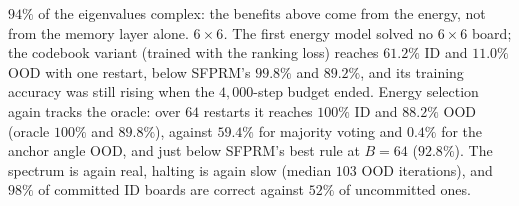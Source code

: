 $94\%$ of the eigenvalues complex: the benefits above come from the energy, not from the memory
layer alone.
\emph{$6\times6$.} The first energy model solved no $6\times6$ board; the codebook variant (trained
with the ranking loss) reaches $61.2\%$ ID and $11.0\%$ OOD with one restart, below SFPRM's
$99.8\%$ and $89.2\%$, and its training accuracy was still rising when the $4{,}000$-step budget
ended. Energy selection again tracks the oracle: over $64$ restarts it reaches $100\%$ ID and
$88.2\%$ OOD (oracle $100\%$ and $89.8\%$), against $59.4\%$ for majority voting and $0.4\%$ for
the anchor angle OOD, and just below SFPRM's best rule at $B{=}64$ ($92.8\%$). The spectrum is again
real, halting is again slow (median $103$ OOD iterations), and $98\%$ of committed ID boards are
correct against $52\%$ of uncommitted ones.


